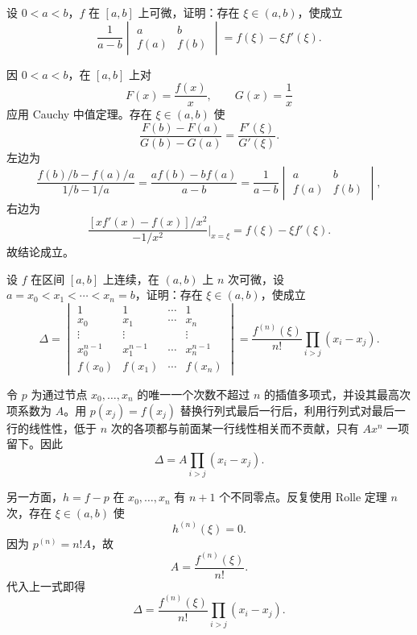 \begin{xreferenceproblem}[10]
设 $0<a<b$，$f$ 在 $[a,b]$ 上可微，证明：存在 $\xi\in(a,b)$，使成立
\[
  \frac{1}{a-b}
  \begin{vmatrix}
    a&b\\
    f(a)&f(b)
  \end{vmatrix}
  =f(\xi)-\xi f'(\xi).
\]
\end{xreferenceproblem}
\begin{xsolution}
因 $0<a<b$，在 $[a,b]$ 上对
\[
  F(x)=\frac{f(x)}x,
  \qquad
  G(x)=\frac1x
\]
应用 Cauchy 中值定理。存在 $\xi\in(a,b)$ 使
\[
  \frac{F(b)-F(a)}{G(b)-G(a)}
  =\frac{F'(\xi)}{G'(\xi)}.
\]
左边为
\[
  \frac{f(b)/b-f(a)/a}{1/b-1/a}
  =\frac{af(b)-bf(a)}{a-b}
  =\frac1{a-b}
  \begin{vmatrix}a&b\\ f(a)&f(b)\end{vmatrix},
\]
右边为
\[
  \frac{[xf'(x)-f(x)]/x^2}{-1/x^2}\Big|_{x=\xi}
  =f(\xi)-\xi f'(\xi).
\]
故结论成立。
\end{xsolution}


\begin{xreferenceproblem}[11]
设 $f$ 在区间 $[a,b]$ 上连续，在 $(a,b)$ 上 $n$ 次可微，设 $a=x_0<x_1<\cdots<x_n=b$，证明：存在 $\xi\in(a,b)$，使成立
\[
  \Delta=
  \begin{vmatrix}
    1&1&\cdots&1\\
    x_0&x_1&\cdots&x_n\\
    \vdots&\vdots&&\vdots\\
    x_0^{n-1}&x_1^{n-1}&\cdots&x_n^{n-1}\\
    f(x_0)&f(x_1)&\cdots&f(x_n)
  \end{vmatrix}
  =\frac{f^{(n)}(\xi)}{n!}\prod_{i>j}(x_i-x_j).
\]
\end{xreferenceproblem}
\begin{xsolution}
令 $p$ 为通过节点 $x_0,\ldots,x_n$ 的唯一一个次数不超过 $n$ 的插值多项式，并设其最高次项系数为 $A$。用 $p(x_j)=f(x_j)$ 替换行列式最后一行后，利用行列式对最后一行的线性性，低于 $n$ 次的各项都与前面某一行线性相关而不贡献，只有 $Ax^n$ 一项留下。因此
\[
  \Delta=A\prod_{i>j}(x_i-x_j).
\]

另一方面，$h=f-p$ 在 $x_0,\ldots,x_n$ 有 $n+1$ 个不同零点。反复使用 Rolle 定理 $n$ 次，存在 $\xi\in(a,b)$ 使
\[
  h^{(n)}(\xi)=0.
\]
因为 $p^{(n)}=n!A$，故
\[
  A=\frac{f^{(n)}(\xi)}{n!}.
\]
代入上一式即得
\[
  \Delta=\frac{f^{(n)}(\xi)}{n!}
  \prod_{i>j}(x_i-x_j).
\]
\end{xsolution}


